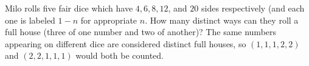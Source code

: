 Milo rolls five fair dice which have $4,6,8,12$, and $20$ sides respectively (and each one is labeled $1-n$ for appropriate $n$. How many distinct ways can they roll a full house (three of one number and two of another)? The same numbers appearing on different dice are considered distinct full houses, so $(1,1,1,2,2)$ and $(2,2,1,1,1)$ would both be counted.